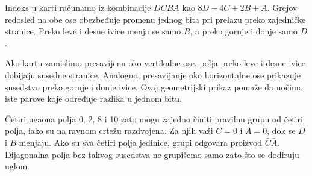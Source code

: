 
Indeks u karti računamo iz kombinacije \(DCBA\) kao \(8D+4C+2B+A\). Grejov redosled na obe ose obezbeđuje promenu jednog bita pri prelazu preko zajedničke stranice. Preko leve i desne ivice menja se samo \(B\), a preko gornje i donje samo \(D\).

Ako kartu zamislimo presavijenu oko vertikalne ose, polja preko leve i desne ivice dobijaju susedne stranice. Analogno, presavijanje oko horizontalne ose prikazuje susedstvo preko gornje i donje ivice. Ovaj geometrijski prikaz pomaže da uočimo iste parove koje određuje razlika u jednom bitu.

Četiri ugaona polja 0, 2, 8 i 10 zato mogu zajedno činiti pravilnu grupu od četiri polja, iako su na ravnom crtežu razdvojena. Za njih važi \(C=0\) i \(A=0\), dok se \(D\) i \(B\) menjaju. Ako su sva četiri polja jedinice, grupi odgovara proizvod \(\bar C\bar A\). Dijagonalna polja bez takvog susedstva ne grupišemo samo zato što se dodiruju uglom.
